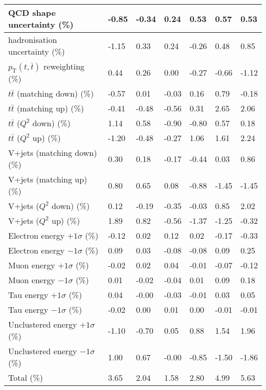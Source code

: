 \begin{table}[htp]
{\begin{tabular}{l|l|l|l|l|l|l}
	\midrule
	QCD shape uncertainty (\%) & -0.85 & -0.34 & 0.24 & 0.53 & 0.57 & 0.53\\ 
	\midrule
	hadronisation uncertainty (\%) & -1.15 & 0.33 & 0.24 & -0.26 & 0.48 & 0.85\\ 
	\midrule
	$p_\mathrm{T}(t,\bar{t})$ reweighting (\%) & 0.44 & 0.26 & 0.00 & -0.27 & -0.66 & -1.12\\ 
	\midrule
	$t\bar{t}$ (matching down) (\%) & -0.57 & 0.01 & -0.03 & 0.16 & 0.79 & -0.18\\ 
	$t\bar{t}$ (matching up) (\%) & -0.41 & -0.48 & -0.56 & 0.31 & 2.65 & 2.06\\ 
	$t\bar{t}$ ($Q^{2}$ down) (\%) & 1.14 & 0.58 & -0.90 & -0.80 & 0.57 & 0.18\\ 
	$t\bar{t}$ ($Q^{2}$ up) (\%) & -1.20 & -0.48 & -0.27 & 1.06 & 1.61 & 2.24\\ 
	\midrule
	V+jets (matching down) (\%) & 0.30 & 0.18 & -0.17 & -0.44 & 0.03 & 0.86\\ 
	V+jets (matching up) (\%) & 0.80 & 0.65 & 0.08 & -0.88 & -1.45 & -1.45\\ 
	V+jets ($Q^{2}$ down) (\%) & 0.12 & -0.19 & -0.35 & -0.03 & 0.85 & 2.02\\ 
	V+jets ($Q^{2}$ up) (\%) & 1.89 & 0.82 & -0.56 & -1.37 & -1.25 & -0.32\\ 
	\midrule
	Electron energy $+1\sigma$ (\%) & -0.12 & 0.02 & 0.12 & 0.02 & -0.17 & -0.33\\ 
	Electron energy $-1\sigma$ (\%) & 0.09 & 0.03 & -0.08 & -0.08 & 0.09 & 0.25\\ 
	Muon energy $+1\sigma$ (\%) & -0.02 & 0.02 & 0.04 & -0.01 & -0.07 & -0.12\\ 
	Muon energy $-1\sigma$ (\%) & 0.01 & -0.02 & -0.04 & 0.01 & 0.09 & 0.18\\ 
	Tau energy $+1\sigma$ (\%) & 0.04 & -0.00 & -0.03 & -0.01 & 0.03 & 0.05\\ 
	Tau energy $-1\sigma$ (\%) & -0.02 & 0.00 & 0.01 & 0.00 & -0.01 & -0.01\\ 
	Unclustered energy $+1\sigma$ (\%) & -1.10 & -0.70 & 0.05 & 0.88 & 1.54 & 1.96\\ 
	Unclustered energy $-1\sigma$ (\%) & 1.00 & 0.67 & -0.00 & -0.85 & -1.50 & -1.86\\ 
	\midrule
	Total (\%) & 3.65  & 2.04  & 1.58  & 2.80  & 4.99  & 5.63 \\
	\bottomrule
	\end{tabular}
}
\end{table}